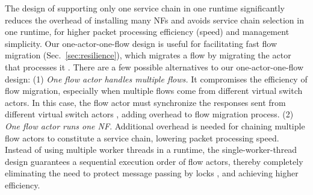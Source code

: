 \vspace{1mm}
 The design of supporting only one service chain in one runtime significantly reduces the overhead of installing many NFs and avoids service chain selection in one runtime, for higher packet processing efficiency (speed) and management simplicity. Our one-actor-one-flow design is useful for facilitating fast flow migration (Sec.~\ref{sec:resilience}), which migrates a flow by migrating the actor that processes it . There are a few possible alternatives to our one-actor-one-flow design: (1) {\em One flow actor handles multiple flows.} It compromises the efficiency of flow migration, especially when multiple flows come from different virtual switch actors. In this case, the flow actor must synchronize the responses sent from different virtual switch actors , adding overhead to flow migration process. (2) {\em One flow actor runs one NF}. Additional overhead is needed for chaining multiple flow actors to constitute a service chain, lowering packet processing speed. %
Instead of using multiple worker threads in a runtime, the single-worker-thread design guarantees a sequential execution order of flow actors, thereby completely eliminating the need to protect message passing by locks , and achieving higher efficiency.








